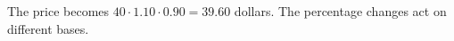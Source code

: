 The price becomes $40\cdot1.10\cdot0.90=\boxed{39.60}$ dollars. The percentage changes act on different bases.
